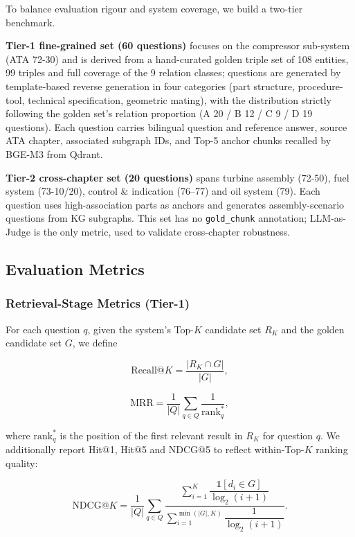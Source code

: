 \documentclass[applsci,article,submit,pdftex,moreauthors]{Definitions/mdpi}
\begin{document}
To balance evaluation rigour and system coverage, we build a two-tier benchmark.

\textbf{Tier-1 fine-grained set (60 questions)} focuses on the compressor sub-system (ATA 72-30) and is derived from a hand-curated golden triple set of 108 entities, 99 triples and full coverage of the 9 relation classes; questions are generated by template-based reverse generation in four categories (part structure, procedure-tool, technical specification, geometric mating), with the distribution strictly following the golden set's relation proportion (A 20 / B 12 / C 9 / D 19 questions). Each question carries bilingual question and reference answer, source ATA chapter, associated subgraph IDs, and Top-5 anchor chunks recalled by BGE-M3 from Qdrant.

\textbf{Tier-2 cross-chapter set (20 questions)} spans turbine assembly (72-50), fuel system (73-10/20), control \& indication (76--77) and oil system (79). Each question uses high-association parts as anchors and generates assembly-scenario questions from KG subgraphs. This set has no \texttt{gold\_chunk} annotation; LLM-as-Judge is the only metric, used to validate cross-chapter robustness.

\subsection{Evaluation Metrics}
\label{sec:exp-metrics}

\subsubsection{Retrieval-Stage Metrics (Tier-1)}

For each question $q$, given the system's Top-$K$ candidate set $R_K$ and the golden candidate set $G$, we define
\begin{linenomath}
\begin{equation}
\text{Recall@}K = \frac{|R_K\cap G|}{|G|},
\label{eq:recall}
\end{equation}
\end{linenomath}
\begin{linenomath}
\begin{equation}
\text{MRR} = \frac{1}{|Q|}\sum_{q\in Q}\frac{1}{\text{rank}^{*}_q},
\label{eq:mrr}
\end{equation}
\end{linenomath}
where $\text{rank}^{*}_q$ is the position of the first relevant result in $R_K$ for question $q$. We additionally report Hit@1, Hit@5 and NDCG@5 to reflect within-Top-$K$ ranking quality:
\begin{linenomath}
\begin{equation}
\text{NDCG@}K = \frac{1}{|Q|}\sum_{q\in Q}\frac{\sum_{i=1}^{K}\dfrac{\mathbb{1}[d_i\in G]}{\log_2(i+1)}}{\sum_{i=1}^{\min(|G|,K)}\dfrac{1}{\log_2(i+1)}}.
\label{eq:ndcg}
\end{equation}
\end{linenomath}
\end{document}

